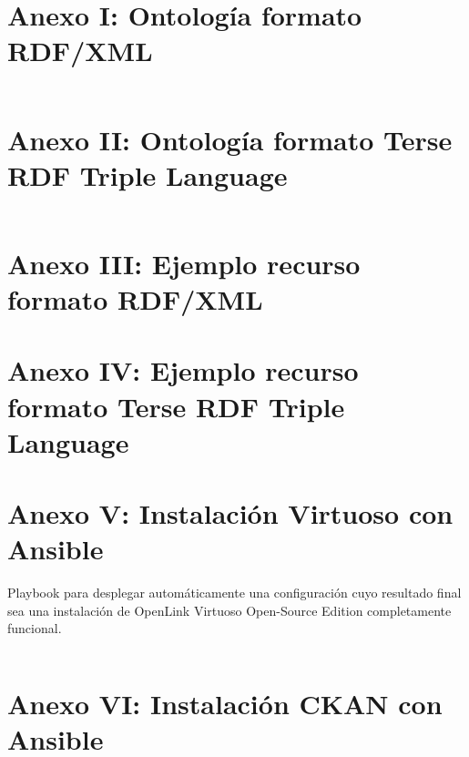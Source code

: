\chapter*{Anexo I: Ontología formato RDF/XML}

\label{anexo_i}
\inputminted[tabsize=2,breaklines]{xml}{../../data/semantic/ontology/ugr.rdf}

\chapter*{Anexo II: Ontología formato Terse RDF Triple Language}
\label{anexo_ii}
\inputminted[tabsize=2,breaklines]{text}{../../data/semantic/ontology/ugr.ttl}

\chapter*{Anexo III: Ejemplo recurso formato RDF/XML}

\chapter*{Anexo IV: Ejemplo recurso formato Terse RDF Triple Language}

\chapter*{Anexo V: Instalación Virtuoso con Ansible}

{\sf Playbook} para desplegar automáticamente una configuración cuyo resultado final sea una instalación de {\sf OpenLink Virtuoso Open-Source Edition} completamente funcional.

\label{anexo_v}
\inputminted[tabsize=2,breaklines]{yaml}{../../ansible/virtuoso.yml}

\chapter*{Anexo VI: Instalación CKAN con Ansible}
